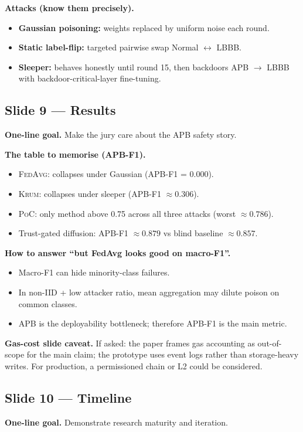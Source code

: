 \documentclass[11pt,a4paper]{article}
\newcommand{\poc}{\textsc{PoC}\xspace}
\newcommand{\fedavg}{\textsc{FedAvg}\xspace}
\newcommand{\krum}{\textsc{Krum}\xspace}
\newcommand{\apbf}{APB-F1\xspace}
\begin{document}
\textbf{Attacks (know them precisely).}
\begin{itemize}
\item \textbf{Gaussian poisoning:} weights replaced by uniform noise each round.
\item \textbf{Static label-flip:} targeted pairwise swap Normal $\leftrightarrow$ LBBB.
\item \textbf{Sleeper:} behaves honestly until round 15, then backdoors APB $\rightarrow$ LBBB with backdoor-critical-layer fine-tuning.
\end{itemize}

\subsection{Slide 9 --- Results}
\textbf{One-line goal.} Make the jury care about the APB safety story.

\textbf{The table to memorise (APB-F1).}
\begin{itemize}
\item \fedavg: collapses under Gaussian (APB-F1 = 0.000).
\item \krum: collapses under sleeper (APB-F1 \(\approx 0.306\)).
\item \poc: only method above 0.75 across all three attacks (worst \(\approx 0.786\)).
\item Trust-gated diffusion: APB-F1 \(\approx 0.879\) vs blind baseline \(\approx 0.857\).
\end{itemize}

\textbf{How to answer ``but FedAvg looks good on macro-F1''.}
\begin{itemize}
\item Macro-F1 can hide minority-class failures.
\item In non-IID + low attacker ratio, mean aggregation may dilute poison on common classes.
\item APB is the deployability bottleneck; therefore \apbf is the main metric.
\end{itemize}

\textbf{Gas-cost slide caveat.}
If asked: the paper frames gas accounting as out-of-scope for the main claim; the prototype uses event logs rather than storage-heavy writes. For production, a permissioned chain or L2 could be considered.

\subsection{Slide 10 --- Timeline}
\textbf{One-line goal.} Demonstrate research maturity and iteration.
\end{document}
